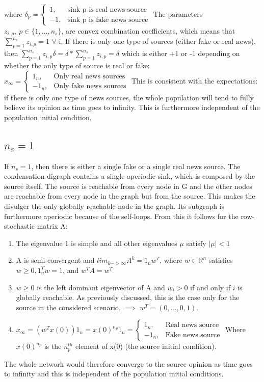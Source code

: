 where 
$
\delta_p = 
\begin{cases}
1,& \text{sink p is real news source}\\
-1,& \text{sink p is fake news source}
\end{cases}
$
The parameters $z_{i,p},\ p\in\{1,...,n_s\}$, are convex combination coefficients, which means that $\sum_{p=1}^{n_s} z_{i,p} = 1$ $\forall$ i.
If there is only one type of sources (either fake or real news), then $\sum_{p=1}^{n_s} z_{i,p}\delta = \delta*\sum_{p=1}^{n_s} z_{i,p} = \delta$ which is either +1 or -1 depending on whether the only type of source is real or fake: 
$x_\infty = 
\begin{cases}
1_n,& \text{Only real news sources}\\
-1_n,& \text{Only fake news sources}
\end{cases}$
This is consistent with the expectations: if there is only one type of news sources, the whole population will tend to fully believe its opinion as time goes to infinity. This is furthermore independent of the population initial condition.
\subsection{$n_s = 1$}
If $n_s=1$, then there is either a single fake or a single real news source. The condensation digraph contains a single aperiodic sink, which is composed by the source itself. The source is reachable from every node in G and the other nodes are reachable from every node in the graph but from the source. This makes the divulger the only globally reachable node in the graph. Its subgraph is furthermore aperiodic because of the self-loops. From this it follows for the row-stochastic matrix A:
\begin{enumerate}
	\item
	The eigenvalue 1 is simple and all other eigenvalues $\mu$ satisfy $|\mu|<1$
	\item
	A is semi-convergent and $lim_{k->\infty} A^k = 1_n w^T$, where $w \in \mathbb{R}^n$ satisfies $w\geq0, 1_n^T w = 1$, and $w^TA=w^T$
	\item
	$w\geq0$ is the left dominant eigenvector of A and $w_i>0$ if and only if $i$ is globally reachable. As previously discussed, this is the case only for the source in the considered scenario. \newline
	$\implies$ $w^T = (0,...,0,1)$.
	\item
	$x_\infty = (w^T x(0))1_n = x(0)^{n_p} 1_n = 	\begin{cases}
	1_n,& \text{Real news source}\\
	-1_n, & \text{Fake news source}
	\end{cases}$
	Where $x(0)^{n_p}$ is the $n_p^{th}$ element of x(0) (the source initial condition). 
\end{enumerate}
The whole network would therefore converge to the source opinion as time goes to infinity and this is independent of the population initial conditions.
